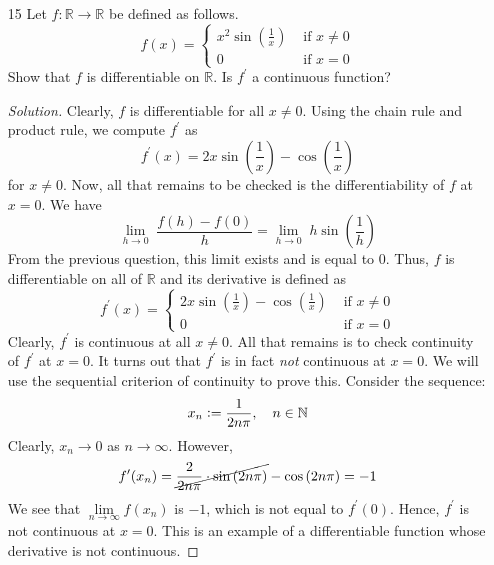 \documentclass[12pt]{article}
\def\ddfrac#1#2{\displaystyle\frac{\displaystyle #1}{\displaystyle #2}}
\theoremstyle{definition}
\newenvironment{soln}{\begin{proof}[Solution]}{\end{proof}}
\begin{document}
\begin{enumerate}[leftmargin=*]
    \item[15] Let $f \colon \mathbb{R} \to \mathbb{R}$ be defined as follows. 
    \[
        f(x) = \begin{cases}
            x^2 \sin\left( \ddfrac{1}{x} \right) & \text{ if } x \neq 0 \\
            0 & \text{ if } x=0
        \end{cases}
    \]
    Show that $f$ is differentiable on $\mathbb{R}$. Is $f^{\prime}$ a continuous function?
    \begin{soln}
        Clearly, $f$ is differentiable for all $x \neq 0$. Using the chain rule and product rule, we compute $f^{\prime}$ as 
        \[
            f^{\prime}(x) = 2x \sin\left( \frac{1}{x} \right) - \cos\left( \frac{1}{x} \right)
        \]
        for $x \neq 0$. Now, all that remains to be checked is the differentiability of $f$ at $x=0$. We have
        \[
            \lim_{h \to 0} \; \frac{f(h) - f(0)}{h} = \lim_{h \to 0} \; h \sin{\left( \frac{1}{h}\right)}
        \]
        From the previous question, this limit exists and is equal to $0$. Thus, $f$ is differentiable on all of $\mathbb{R}$ and its derivative is defined as
        \[
            f^{\prime}(x) = \begin{cases}
                2x \sin \left( \ddfrac{1}{x} \right) - \cos \left( \ddfrac{1}{x} \right) & \text{ if } x \neq 0 \\
                0 & \text{ if } x = 0
            \end{cases}
        \]
        Clearly, $f^{\prime}$ is continuous at all $x \neq 0$. All that remains is to check continuity of $f^{\prime}$ at $x=0$. It turns out that $f^{\prime}$ is in fact \textit{not} continuous at $x=0$. We will use the sequential criterion of continuity to prove this. Consider the sequence:
        \[
            x_n \vcentcolon= \frac{1}{2n\pi}, \quad n \in \mathbb{N}
        \] Clearly, $x_n \to 0$ as $n \to \infty$. However, 
        \[
            f^{\prime}(x_n) = \cancel{\frac{2}{2n\pi} \cdot \sin\left( 2n\pi \right)} - \cos \left( 2n \pi \right) = -1
        \]
        We see that $\lim\limits_{n \to \infty} f(x_n)$ is $-1$, which is not equal to $f^{\prime}(0)$. Hence, $f^{\prime}$ is not continuous at $x=0$. This is an example of a differentiable function whose derivative is not continuous.
    \end{soln}
    
    \newpage 
    

\end{enumerate}
\end{document}
